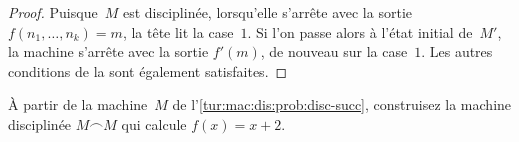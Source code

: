 \documentclass[../../../include/open-logic-section]{subfiles}
\begin{document}
\begin{proof}
    Puisque~$M$ est disciplinée, lorsqu'elle s'arrête
    avec la sortie $f(n_1,\dots,n_k)=m$, la tête lit
    la case~$1$. Si l'on passe alors à l'état initial
    de~$M'$, la machine s'arrête avec la sortie
    $f'(m)$, de nouveau sur la case~$1$.
    Les autres conditions de la
     sont également satisfaites.
\end{proof}

\begin{prob}
    À partir de la machine~$M$ de
    l'\cref{tur:mac:dis:prob:disc-succ}, construisez
    la machine disciplinée $M\frown M$
    qui calcule $f(x)=x+2$.
\end{prob}
\end{document}
